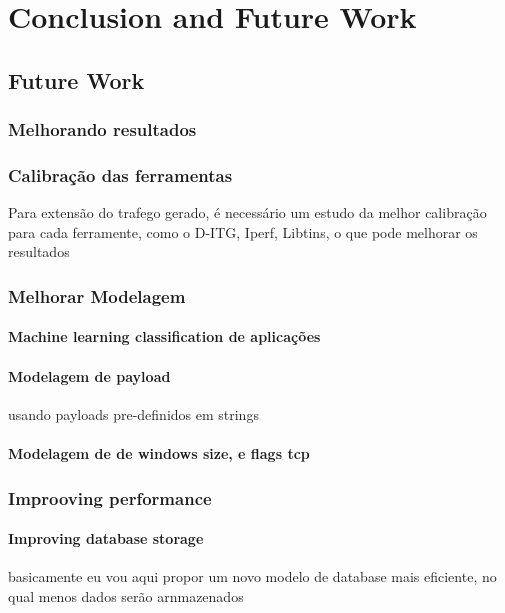 \chapter{Conclusion and Future Work}
\label{ch:conclusion}

\section{Future Work}

\subsection{Melhorando resultados}

\subsection{Calibração das ferramentas}

Para extensão do trafego gerado, é necessário um estudo da melhor calibração para cada ferramente, como o D-ITG, Iperf, Libtins, o que pode melhorar os resultados

\subsection{Melhorar Modelagem}
\subsubsection{Machine learning classification de aplicações}
\subsubsection{Modelagem de payload}
usando payloads pre-definidos em strings
\subsubsection{Modelagem de de windows size, e flags tcp}



\subsection{Improoving performance}

\subsubsection{Improving database storage}

basicamente eu vou aqui propor um novo modelo de database mais eficiente, no qual menos dados serão arnmazenados

